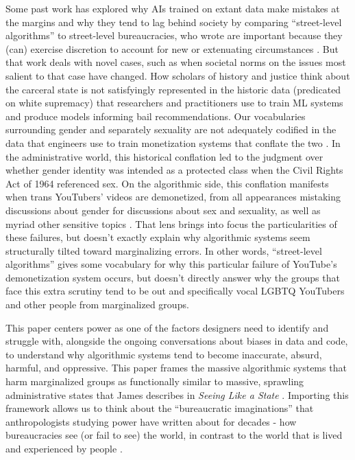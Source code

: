 \documentclass[manuscript,screen]{acmart}
\begin{document}
Some past work has explored why AIs trained on extant data make mistakes at the margins and why they tend to lag behind society by comparing ``street-level algorithms'' to street-level bureaucracies, who \citeauthor{lipsky1980street} wrote are important because they (can) exercise discretion to account for new or extenuating circumstances
\cite{streetLevelAlgorithms,lipsky1980street}.
But that work deals with novel cases, such as when societal norms on the issues most salient to that case have changed.
How scholars of history and justice think about the carceral state is not satisfyingly represented in the historic data (predicated on white supremacy) that researchers and practitioners use to train ML systems and produce models informing bail recommendations.
Our vocabularies surrounding gender and separately sexuality
are not adequately codified in the data that engineers use to train monetization systems that conflate the two
\cite{streetLevelAlgorithms}.
In the administrative world, this historical conflation led to the judgment over whether gender identity was intended as a protected class when the Civil Rights Act of 1964 referenced sex.
On the algorithmic side, this conflation manifests when trans YouTubers' videos are demonetized, from all appearances mistaking discussions about gender for discussions about sex and sexuality, as well as myriad other sensitive topics
\cite{tesfaiyoutube,pottinger2018don,doi:10.1177/2056305120936636}.
That lens brings into focus the particularities of these failures, but doesn't exactly explain why algorithmic systems seem structurally tilted toward marginalizing errors.
In other words, ``street-level algorithms'' gives some vocabulary for why this particular failure of YouTube's demonetization system occurs, but doesn't directly answer why the groups that face this extra scrutiny tend to be out and specifically vocal LGBTQ YouTubers and other people from marginalized groups.

This paper centers power as one of the factors designers need to identify and struggle with, alongside the ongoing conversations about biases in data and code, to understand why algorithmic systems tend to become inaccurate, absurd, harmful, and oppressive.
This paper frames the massive algorithmic systems that harm marginalized groups as functionally similar to massive, sprawling administrative states that James \citeauthor{scott1998seeing} describes in \emph{Seeing Like a State}
\cite{scott1998seeing}.
Importing this framework allows us to think about the ``bureaucratic imaginations'' that anthropologists studying power have written about for decades - how bureaucracies see (or fail to see) the world, in contrast to the world that is lived and experienced by people
\cite{nuimeprn1123}.
\end{document}
